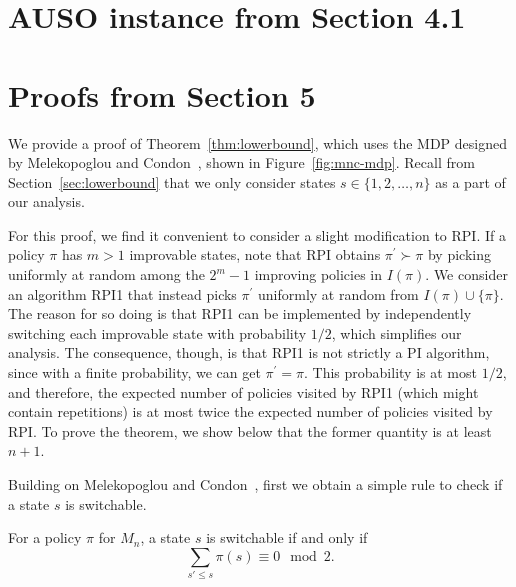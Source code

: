 

\begin{appendices}

\section{AUSO instance from Section 4.1}
\label{app:upperbounds}



\section{Proofs from Section 5}
\label{app:lowerbound}
\setcounter{theorem}{9}

We provide a proof of Theorem~\ref{thm:lowerbound}, which uses the MDP designed by Melekopoglou and Condon~, shown in Figure~\ref{fig:mnc-mdp}. Recall from Section~\ref{sec:lowerbound} that we only consider states $s \in \{1, 2, \dots, n\}$ as a part of our analysis.

For this proof, we find it convenient to consider a slight modification to RPI. If a policy $\pi$ has $m > 1$ improvable states, note that RPI obtains $\pi^{\prime} \succ \pi$ by picking uniformly at random among the $2^{m} - 1$ improving policies in $I(\pi)$. We consider an algorithm RPI1 that instead picks $\pi^{\prime}$ uniformly at random from $I(\pi) \cup \{\pi\}$. The reason for so doing is that RPI1 can be implemented by independently switching each improvable state with probability $1/2$, which simplifies our analysis. The consequence, though, is that RPI1 is not strictly a PI algorithm, since with a finite probability, we can get $\pi^{\prime} = \pi$. This probability is at most $1/2$, and therefore, the expected number of policies visited by RPI1 (which might contain repetitions) is at most twice the expected number of policies visited by RPI. To prove the theorem, we show below that the former quantity is at least $n + 1$.

Building on  Melekopoglou and Condon~, first we obtain a simple rule to check if a state $s$ is switchable. 


\begin{lemma}
\label{l1}
For a policy $\pi$ for $M_n$, a state $s$ is switchable if and only if $$\sum_{s'\le s}\pi(s) \equiv 0 \mod 2.$$
\end{lemma}


\end{appendices}
